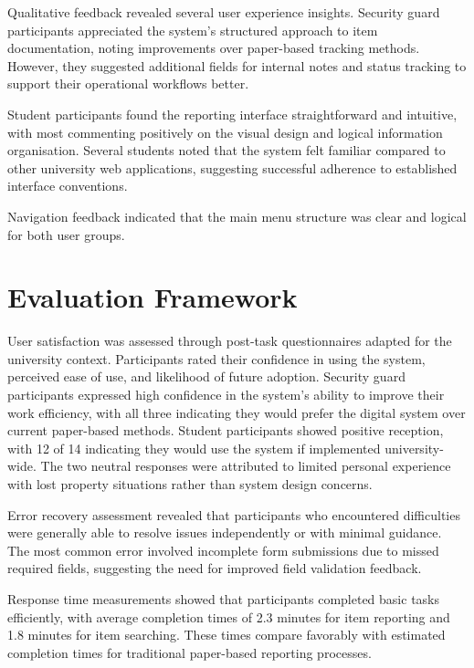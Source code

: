 Qualitative feedback revealed several user experience insights. Security guard participants appreciated the system's structured approach to item documentation, noting improvements over paper-based tracking methods. However, they suggested additional fields for internal notes and status tracking to support their operational workflows better.

Student participants found the reporting interface straightforward and intuitive, with most commenting positively on the visual design and logical information organisation. Several students noted that the system felt familiar compared to other university web applications, suggesting successful adherence to established interface conventions.

Navigation feedback indicated that the main menu structure was clear and logical for both user groups.


\section{Evaluation Framework} \label{section:evaluation_framework}

User satisfaction was assessed through post-task questionnaires adapted for the university context. Participants rated their confidence in using the system, perceived ease of use, and likelihood of future adoption. Security guard participants expressed high confidence in the system's ability to improve their work efficiency, with all three indicating they would prefer the digital system over current paper-based methods. Student participants showed positive reception, with 12 of 14 indicating they would use the system if implemented university-wide. The two neutral responses were attributed to limited personal experience with lost property situations rather than system design concerns.

Error recovery assessment revealed that participants who encountered difficulties were generally able to resolve issues independently or with minimal guidance. The most common error involved incomplete form submissions due to missed required fields, suggesting the need for improved field validation feedback.

Response time measurements showed that participants completed basic tasks efficiently, with average completion times of 2.3 minutes for item reporting and 1.8 minutes for item searching. These times compare favorably with estimated completion times for traditional paper-based reporting processes.

